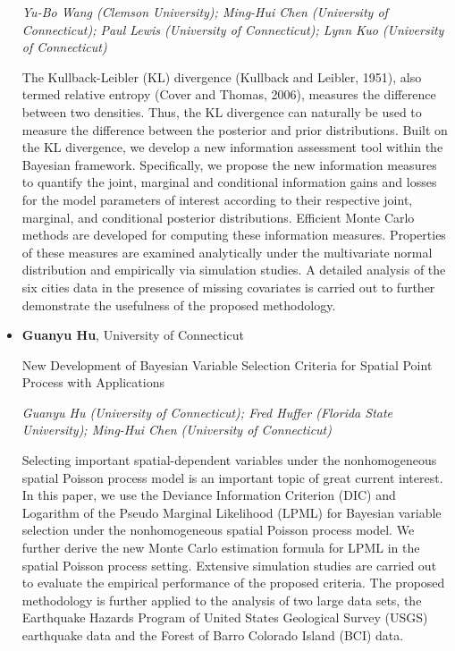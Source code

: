 \begin{itemize}
\emph{\footnotesize Yu-Bo Wang (Clemson University); Ming-Hui Chen (University of Connecticut);  Paul Lewis (University of Connecticut); Lynn Kuo (University of Connecticut)}

The Kullback-Leibler (KL) divergence (Kullback and Leibler, 1951),  also termed relative entropy (Cover and Thomas, 2006), measures the difference between two densities. Thus, the KL divergence can naturally be used to measure the difference between the posterior and prior distributions. Built on the KL divergence, we develop a new information assessment tool within the Bayesian framework. Specifically, we propose the new information  measures to quantify the joint, marginal and conditional information gains and losses for the model parameters of interest according to their respective joint, marginal, and conditional posterior distributions. Efficient Monte Carlo methods are developed for computing these information measures. Properties of these measures are examined analytically under the multivariate normal distribution and empirically via simulation studies. A detailed analysis of the six cities data in the presence of missing covariates is carried out to further demonstrate the usefulness of the proposed methodology.

\item \textbf{Guanyu Hu}, University of Connecticut

New Development of Bayesian Variable Selection Criteria for Spatial Point Process with Applications

\emph{\footnotesize Guanyu Hu (University of Connecticut); Fred Huffer (Florida State University); Ming-Hui Chen (University of Connecticut)}

Selecting important spatial-dependent variables under the nonhomogeneous spatial Poisson process model is an important topic of great current interest. In this paper, we use the Deviance Information Criterion (DIC) and Logarithm of the Pseudo Marginal Likelihood (LPML) for Bayesian variable selection under the nonhomogeneous spatial Poisson process model. We further derive the new Monte Carlo estimation formula for LPML in the spatial Poisson process setting. Extensive simulation studies are carried out to evaluate the empirical performance of the proposed criteria. The proposed methodology is further applied to the analysis of two large data sets, the Earthquake Hazards Program of United States Geological Survey (USGS) earthquake data and the Forest of Barro Colorado Island (BCI) data.

\end{itemize}


